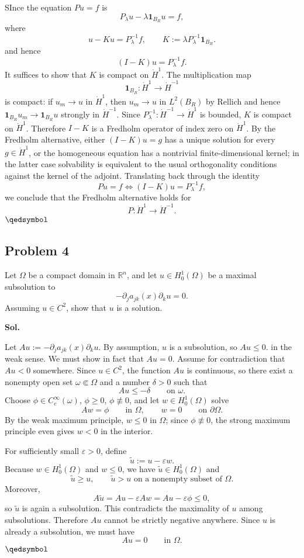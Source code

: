 \documentclass[lang=en,11pt,a4paper,citestyle=authoryear]{elegantpaper}
\newcommand{\prvd}{$\hfill \qedsymbol$}
\newcommand{\R}{\mathbb{R}}
\begin{document}
SInce the equation $Pu=f$ is
\[
P_\lambda u - \lambda \mathbf{1}_{B_R}u = f,
\]
where
\[
u - Ku = P_\lambda^{-1}f,
\qquad K:=\lambda P_\lambda^{-1}\mathbf{1}_{B_R}.
\]
and hence
\[
(I-K)u = P_\lambda^{-1}f.
\]
It suffices to show that $K$ is compact on $\dot H^1$. The multiplication map
\[
\mathbf{1}_{B_R}:\dot H^1 \to \dot H^{-1}
\]
is compact: if $u_m\to u$ in $\dot H^1$, then $u_m\to u$ in $L^2(B_R)$ by Rellich and hence $\mathbf{1}_{B_R}u_m\to \mathbf{1}_{B_R}u$ strongly in $\dot H^{-1}$. Since $P_\lambda^{-1}:\dot H^{-1}\to \dot H^1$ is bounded, $K$ is compact on $\dot H^1$. Therefore $I-K$ is a Fredholm operator of index zero on $\dot H^1$. By the Fredholm alternative, either $(I-K)u=g$ has a unique solution for every $g\in \dot H^1$, or the homogeneous equation has a nontrivial finite-dimensional kernel; in the latter case solvability is equivalent to the usual orthogonality conditions against the kernel of the adjoint. Translating back through the identity
\[
Pu=f \iff (I-K)u=P_\lambda^{-1}f,
\]
we conclude that the Fredholm alternative holds for
\[
P:\dot H^1\to \dot H^{-1}.
\]
\prvd

\vspace{0.5em}

\subsection*{Problem 4}
Let $\Omega$ be a compact domain in $\R^n$, and let $u\in H_0^1(\Omega)$ be a maximal subsolution to
\[
-\partial_j a_{jk}(x)\partial_k u = 0.
\]
Assuming $u\in C^2$, show that $u$ is a solution.

\vspace{0.5em}
\textbf{Sol.} \par
Let
\(
A u := -\partial_j a_{jk}(x)\partial_k u.
\)
By assumption, $u$ is a subsolution, so
\(
Au\leq 0.
\)
in the weak sense. We must show in fact that $Au=0$. Assume for contradiction that $Au<0$ somewhere. Since $u\in C^2$, the function $Au$ is continuous, so there exist a nonempty open set $\omega\Subset \Omega$ and a number $\delta>0$ such that
\[
Au \leq -\delta \qquad \text{on }\omega.
\]
Choose $\phi\in C_c^\infty(\omega)$, $\phi\geq 0$, $\phi\not\equiv 0$, and let $w\in H_0^1(\Omega)$ solve
\[
Aw = \phi \qquad \text{in }\Omega,
\qquad w=0 \qquad \text{on }\partial\Omega.
\]
By the weak maximum principle, $w\leq 0$ in $\Omega$; since $\phi\not\equiv 0$, the strong maximum principle even gives $w<0$ in the interior.

For sufficiently small $\varepsilon>0$, define
\[
\tilde u := u - \varepsilon w.
\]
Because $w\in H_0^1(\Omega)$ and $w\leq 0$, we have $\tilde u\in H_0^1(\Omega)$ and
\[
\tilde u \geq u,
\qquad \tilde u>u \text{ on a nonempty subset of }\Omega.
\]
Moreover,
\[
A\tilde u = Au - \varepsilon Aw = Au - \varepsilon\phi \leq 0,
\]
so $\tilde u$ is again a subsolution. This contradicts the maximality of $u$ among subsolutions. Therefore $Au$ cannot be strictly negative anywhere. Since $u$ is already a subsolution, we must have
\[
Au=0 \qquad \text{in }\Omega.
\]\prvd

\vspace{0.5em}
\end{document}
